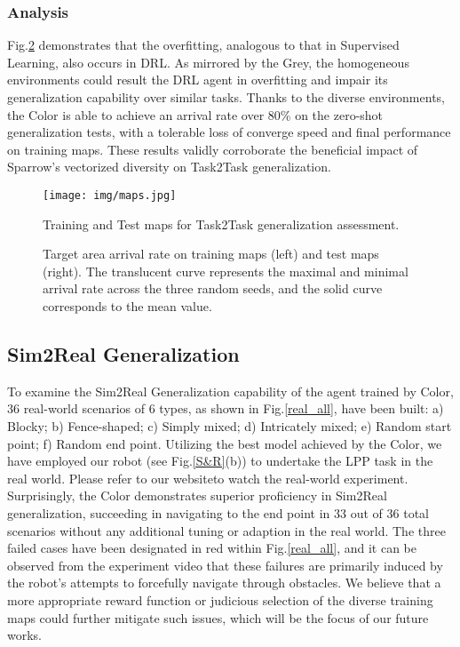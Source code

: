 \documentclass[journal]{IEEEtran}
\begin{document}
\subsubsection{Analysis}
Fig.\ref{arrival_rate} demonstrates that the overfitting, analogous to that in Supervised Learning, also occurs in DRL. As mirrored by the Grey, the homogeneous environments could result the DRL agent in overfitting and impair its generalization capability over similar tasks. Thanks to the diverse environments, the Color is able to achieve an arrival rate over 80\% on the zero-shot generalization tests, with a tolerable loss of converge speed and final performance on training maps. These results validly corroborate the beneficial impact of Sparrow's vectorized diversity on Task2Task generalization.

\begin{figure}
	\centering
	\texttt{[image: img/maps.jpg]}
	\caption{Training and Test maps for Task2Task generalization assessment.}
	\label{maps}
\end{figure}

\begin{figure}
	\centering
	\hfil
	\caption{Target area arrival rate on training maps (left) and test maps (right). The translucent curve represents the maximal and minimal arrival rate across the three random seeds, and the solid curve corresponds to the mean value.}
	\label{arrival_rate}
\end{figure}

\subsection{Sim2Real Generalization}

To examine the Sim2Real Generalization capability of the agent trained by Color, 36 real-world scenarios of 6 types, as shown in Fig.\ref{real_all}, have been built: a) Blocky; b) Fence-shaped; c) Simply mixed; d) Intricately mixed; e) Random start point; f) Random end point. Utilizing the best model achieved by the Color, we have employed our robot (see Fig.\ref{S&R}(b)) to undertake the LPP task in the real world. Please refer to our website\footnotemark[2] to watch the real-world experiment. Surprisingly, the Color demonstrates superior proficiency in Sim2Real generalization, succeeding in navigating to the end point in 33 out of 36 total scenarios without any additional tuning or adaption in the real world. The three failed cases have been designated in red within Fig.\ref{real_all}, and it can be observed from the experiment video that these failures are primarily induced by the robot's attempts to forcefully navigate through obstacles. We believe that a more appropriate reward function or judicious selection of the diverse training maps could further mitigate such issues, which will be the focus of our future works.
\end{document}
